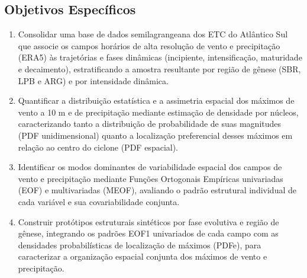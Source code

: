 \subsection{Objetivos Específicos}
\begin{enumerate}
    \item Consolidar uma base de dados semilagrangeana dos ETC do Atlântico Sul que associe os campos horários de alta resolução de vento e precipitação (ERA5) às trajetórias e fases dinâmicas (incipiente, intensificação, maturidade e decaimento), estratificando a amostra resultante por região de gênese (SBR, LPB e ARG) e por intensidade dinâmica.

    \item Quantificar a distribuição estatística e a assimetria espacial dos máximos de vento a 10 m e de precipitação mediante estimação de densidade por núcleos, caracterizando tanto a distribuição de probabilidade de suas magnitudes (PDF unidimensional) quanto a localização preferencial desses máximos em relação ao centro do ciclone (PDF espacial).

    \item Identificar os modos dominantes de variabilidade espacial dos campos de vento e precipitação mediante Funções Ortogonais Empíricas univariadas (EOF) e multivariadas (MEOF), avaliando o padrão estrutural individual de cada variável e sua covariabilidade conjunta.

    \item Construir protótipos estruturais sintéticos por fase evolutiva e região de gênese, integrando os padrões EOF1 univariados de cada campo com as densidades probabilísticas de localização de máximos (PDFe), para caracterizar a organização espacial conjunta dos máximos de vento e precipitação.
\end{enumerate}

